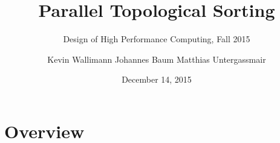 
\usepackage{wrapfig}
\author[]{Kevin Wallimann \quad Johannes Baum \quad Matthias Untergassmair}


\title[Topological Sorting]{Parallel Topological Sorting} %
\subtitle{Design of High Performance Computing, Fall 2015}

\date{December 14, 2015}
	

\begin{frame}
\titlepage %
\end{frame}


\section{Overview}


